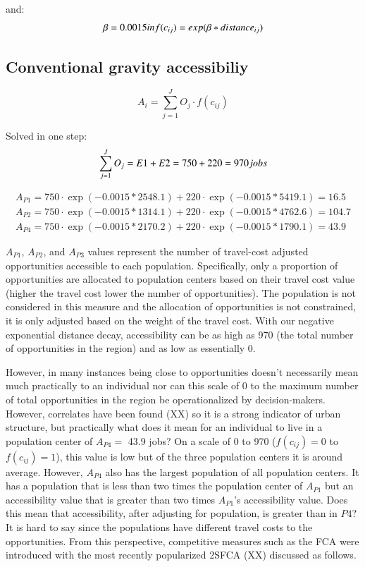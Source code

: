 \documentclass[]{elsarticle} %
\begin{document}
\noindent and: \[
\beta = 0.0015 \space in \space f(c_{ij}) = exp(\beta *distance_{ij})
\]

\hypertarget{conventional-gravity-accessibiliy}{%
\subsection{Conventional gravity
accessibiliy}\label{conventional-gravity-accessibiliy}}

\[
A_i = \sum_{j=1}^JO_j \cdot f(c_{ij})
\]

Solved in one step: \[
\sum_{j=1}^JO_j = E1 + E2 =  750 + 220 = 970 \space jobs
\]

\begin{equation}
\begin{array}{l}
A_{P1} = 750 \cdot \exp(-0.0015 *2548.1) + 220 \cdot \exp(-0.0015 *5419.1) = 16.5 \\
A_{P2} = 750 \cdot \exp(-0.0015 *1314.1) + 220 \cdot \exp(-0.0015 *4762.6) = 104.7 \\
A_{P4} = 750 \cdot \exp(-0.0015 *2170.2) + 220 \cdot \exp(-0.0015 *1790.1) = 43.9
\end{array}
\end{equation}

\(A_{P1}\), \(A_{P2}\), and \(A_{P3}\) values represent the number of
travel-cost adjusted opportunities accessible to each population.
Specifically, only a proportion of opportunities are allocated to
population centers based on their travel cost value (higher the travel
cost lower the number of opportunities). The population is not
considered in this measure and the allocation of opportunities is not
constrained, it is only adjusted based on the weight of the travel cost.
With our negative exponential distance decay, accessibility can be as
high as 970 (the total number of opportunities in the region) and as low
as essentially 0.

However, in many instances being close to opportunities doesn't
necessarily mean much practically to an individual nor can this scale of
0 to the maximum number of total opportunities in the region be
operationalized by decision-makers. However, correlates have been found
(XX) so it is a strong indicator of urban structure, but practically
what does it mean for an individual to live in a population center of
\(A_{P4} =\) 43.9 jobs? On a scale of 0 to 970 (\(f(c_{ij})=0\) to
\(f(c_{ij})=1\)), this value is low but of the three population centers
it is around average. However, \(A_{P4}\) also has the largest
population of all population centers. It has a population that is less
than two times the population center of \(A_{P1}\) but an accessibility
value that is greater than two times \(A_{P1}\)'s accessibility value.
Does this mean that accessibility, after adjusting for population, is
greater than in \(P4\)? It is hard to say since the populations have
different travel costs to the opportunities. From this perspective,
competitive measures such as the FCA were introduced with the most
recently popularized 2SFCA (XX) discussed as follows.
\end{document}
